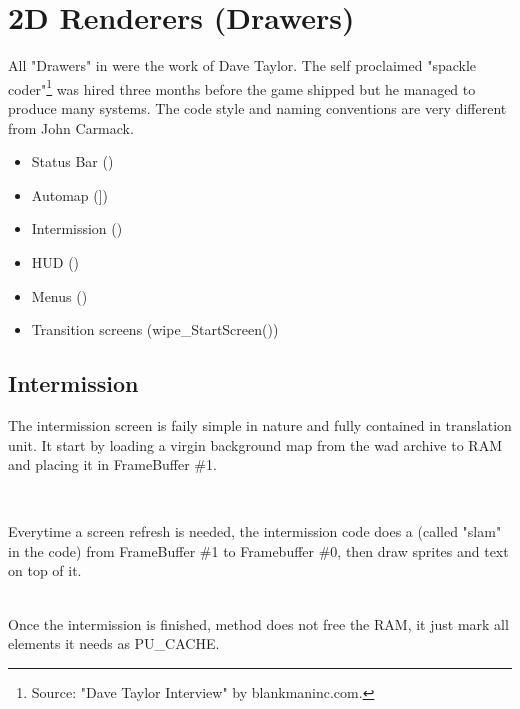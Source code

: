 
\section{2D Renderers (Drawers)}
All "Drawers" in \doom{} were the work of  Dave Taylor. The self proclaimed "spackle coder"\footnote{Source: "Dave Taylor Interview" by blankmaninc.com.} was hired three months before the game shipped but he managed to produce many systems. The code style and naming conventions are very different from John Carmack.
\begin{itemize}
\item Status Bar ()
\item Automap (])
\item Intermission ()
\item HUD ()
\item Menus ()
\item Transition screens (wipe\_StartScreen())
\end{itemize} 
\par




\subsection{Intermission}
The intermission screen is faily simple in nature and fully contained in  translation unit. It start by loading a virgin background map from the wad archive to RAM and placing it in FrameBuffer \#1.\\
\par
{}\\
\par
Everytime a screen refresh is needed, the intermission code does a  (called "slam" in the code) from FrameBuffer \#1 to Framebuffer \#0, then draw sprites and text on top of it.\\
\par
{}\\

Once the intermission is finished, method  does not free the RAM, it just mark all elements it needs as PU\_CACHE.\\




